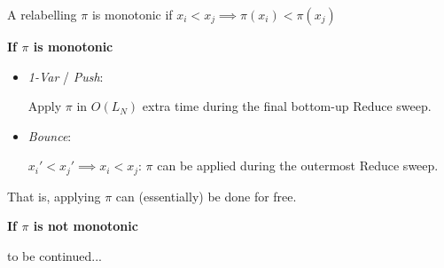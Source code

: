 \documentclass[english, aspectratio=169]{beamer}
\begin{document}
  \begin{frame}
    \begin{definition}
      A relabelling $\pi$ is monotonic if $x_i < x_j \implies \pi(x_i) < \pi(x_j)$
    \end{definition}

    \pause
    {\bf If $\pi$ is monotonic}

    \begin{itemize}
    \item \emph{1-Var} / \emph{Push}:

      Apply $\pi$ in $O(L_N)$ extra time during the final bottom-up Reduce
      sweep.

    \item \emph{Bounce}:

      $x_i' < x_j' \implies x_i < x_j$: $\pi$ can be applied during the
      outermost Reduce sweep.
    \end{itemize}

    \quad That is, applying $\pi$ can (essentially) be done for free.

    \pause
    {\bf If $\pi$ is not monotonic}

    \quad to be continued...
  \end{frame}
\end{document}
